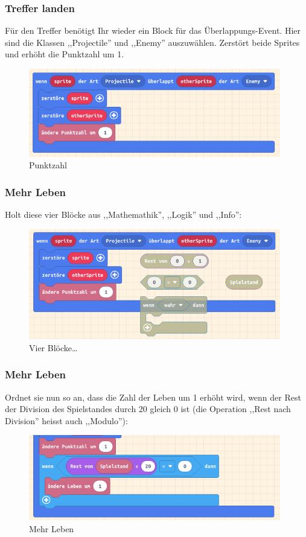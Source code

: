 \documentclass{beamer}
\begin{document}
 \begin{frame}
 \frametitle{Treffer landen}
Für den Treffer benötigt Ihr wieder ein Block für das Überlappungs-Event. Hier sind die Klassen ,,Projectile'' und ,,Enemy'' auszuwählen. Zerstört beide Sprites und erhöht die Punktzahl um 1. 
 
 \begin{figure}
  \includegraphics[width=11cm]{game09.png}
  \caption{Punktzahl}
  \label{fig:game4}
\end{figure}
\end{frame}

 \begin{frame}
 \frametitle{Mehr Leben}
Holt diese vier Blöcke aus ,,Mathemathik'', ,,Logik'' und ,,Info'':  
 
 \begin{figure}
  \includegraphics[width=11cm]{game10.png}
  \caption{Vier Blöcke…}
  \label{fig:game4}
\end{figure}
\end{frame}

 \begin{frame}
 \frametitle{Mehr Leben}
Ordnet sie nun so an, dass die Zahl der Leben um 1 erhöht wird, wenn der Rest der Division des Spielstandes durch 20 gleich 0 ist (die Operation ,,Rest nach Division'' heisst auch ,,Modulo''):
 
 \begin{figure}
  \includegraphics[width=11cm]{game11.png}
  \caption{Mehr Leben}
  \label{fig:game4}
\end{figure}
\end{frame}
\end{document}
